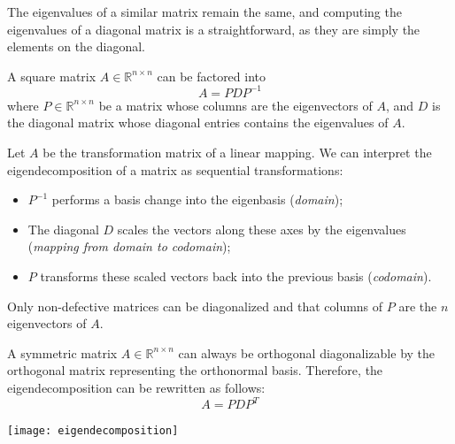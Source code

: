 \documentclass{article}
\begin{document}
The eigenvalues of a similar matrix remain the same, and computing the
eigenvalues of a diagonal matrix is a straightforward, as they are simply the
elements on the diagonal.
\begin{theorem}[Eigendecomposition]
    A square matrix $A\in \mathbb{R}^{n\times n}$ can be factored into 
    $$A=PDP^{-1}$$
    where $P\in \mathbb{R}^{n\times n}$ be a matrix whose columns are the
    eigenvectors of $A$, and $D$ is the diagonal matrix whose diagonal entries
    contains the eigenvalues of $A$.
\end{theorem}
Let $A$ be the transformation matrix of a linear mapping. We can interpret the
eigendecomposition of a matrix as sequential transformations: 
\begin{itemize}
    \item $P^{-1}$ performs a basis change into the eigenbasis
        (\textit{domain});
    \item The diagonal $D$ scales the vectors along these axes by the
        eigenvalues (\textit{mapping from domain to codomain});
    \item $P$ transforms these scaled vectors back into the previous basis
        (\textit{codomain}).
\end{itemize}
Only non-defective matrices can be diagonalized and that columns of $P$ are
the $n$ eigenvectors of $A$.
\begin{theorem}
    A symmetric matrix $A\in \mathbb{R}^{n\times n}$ can always be orthogonal
    diagonalizable by the orthogonal matrix representing the orthonormal
    basis. Therefore, the eigendecomposition can be rewritten as follows:
    $$A=PDP^T$$
\end{theorem}
\begin{center}
    \texttt{[image: eigendecomposition]}
\end{center}
\end{document}
